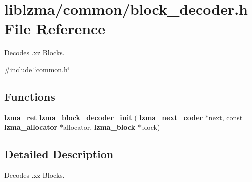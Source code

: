 \section{liblzma/common/block\+\_\+decoder.h File Reference}
\label{block__decoder_8h}


Decodes .xz Blocks.  


{\ttfamily \#include \char`\"{}common.\+h\char`\"{}}\newline
\subsection*{Functions}
\begin{DoxyCompactItemize}
\item 
\mbox{\label{block__decoder_8h_a630ec5d1ef7b0618e3b3a9ced246faf3}} 
\textbf{ lzma\+\_\+ret} {\bfseries lzma\+\_\+block\+\_\+decoder\+\_\+init} (\textbf{ lzma\+\_\+next\+\_\+coder} $\ast$next, const \textbf{ lzma\+\_\+allocator} $\ast$allocator, \textbf{ lzma\+\_\+block} $\ast$block)
\end{DoxyCompactItemize}


\subsection{Detailed Description}
Decodes .xz Blocks. 

